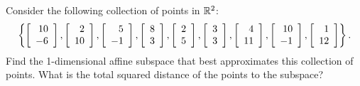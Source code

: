 \documentclass{ximera}
\begin{document}
\begin{example}\label{ex:affine-subspace-fitting}
  Consider the following collection of points in $\R^2$:
  \begin{equation*}
    \set{
      \startmat{r} 10 \\ -6 \stopmat,
      \startmat{r} 2 \\ 10 \stopmat,
      \startmat{r} 5 \\ -1 \stopmat,
      \startmat{r} 8 \\ 3 \stopmat,
      \startmat{r} 2 \\ 5 \stopmat,
      \startmat{r} 3 \\ 3 \stopmat,
      \startmat{r} 4 \\ 11 \stopmat,
      \startmat{r} 10 \\ -1 \stopmat,
      \startmat{r} 1 \\ 12 \stopmat
    }.
  \end{equation*}
  Find the 1-dimensional affine subspace that best approximates this
  collection of points. What is the total squared distance of the
  points to the subspace?
\end{example}
\end{document}
